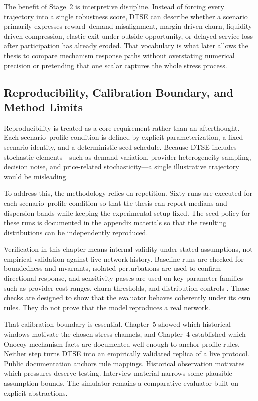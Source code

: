 The benefit of Stage~2 is interpretive discipline. Instead of forcing every trajectory into a single robustness score, DTSE can describe whether a scenario primarily expresses reward--demand misalignment, margin-driven churn, liquidity-driven compression, elastic exit under outside opportunity, or delayed service loss after participation has already eroded. That vocabulary is what later allows the thesis to compare mechanism response paths without overstating numerical precision or pretending that one scalar captures the whole stress process.

\subsection{Reproducibility, Calibration Boundary, and Method Limits}
\label{subsec:dtse_reproducibility}
Reproducibility is treated as a core requirement rather than an afterthought. Each scenario--profile condition is defined by explicit parameterization, a fixed scenario identity, and a deterministic seed schedule. Because DTSE includes stochastic elements—such as demand variation, provider heterogeneity sampling, decision noise, and price-related stochasticity—a single illustrative trajectory would be misleading.

To address this, the methodology relies on repetition. Sixty runs are executed for each scenario--profile condition so that the thesis can report medians and dispersion bands while keeping the experimental setup fixed. The seed policy for these runs is documented in the appendix materials so that the resulting distributions can be independently reproduced.

Verification in this chapter means internal validity under stated assumptions, not empirical validation against live-network history. Baseline runs are checked for boundedness and invariants, isolated perturbations are used to confirm directional response, and sensitivity passes are used on key parameter families such as provider-cost ranges, churn thresholds, and distribution controls \cite{Collins2024, Braakman2022}. Those checks are designed to show that the evaluator behaves coherently under its own rules. They do not prove that the model reproduces a real network.

That calibration boundary is essential. Chapter~5 showed which historical windows motivate the chosen stress channels, and Chapter~4 established which Onocoy mechanism facts are documented well enough to anchor profile rules. Neither step turns DTSE into an empirically validated replica of a live protocol. Public documentation anchors rule mappings. Historical observation motivates which pressures deserve testing. Interview material narrows some plausible assumption bounds. The simulator remains a comparative evaluator built on explicit abstractions.

